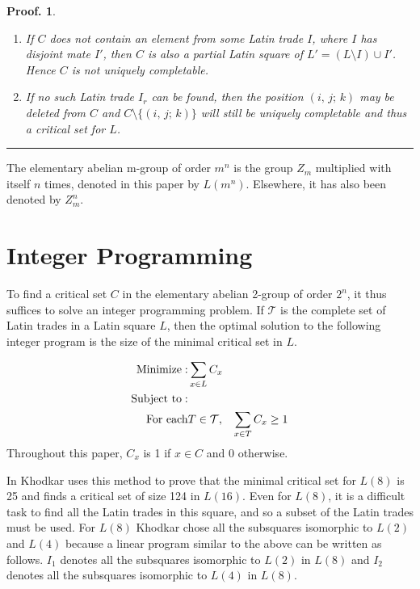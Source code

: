 \documentclass{article}
\newtheorem{preproof}{{\bf Proof.}}
\newenvironment{proof}[1]{\begin{preproof}{\rm
               #1}\hfill{\rule[-0.5mm]{2mm}{2mm}}}{\end{preproof}}
\begin{document}
\begin{proof}{ \noindent
\begin{enumerate}
\item If $C$ does not contain an element from some Latin trade
$I$, where $I$ has  disjoint mate $I'$, then $C$ is also a partial
Latin square of $L'= (L\setminus I)\cup I'$. Hence $C$ is not uniquely
completable.
\item If no such Latin trade $I_r$ can be found, then the position
$(i,\, j;\, k)$ may be deleted from $C$ and $C\setminus\{(i,\,j;\,k)\}$
will still be uniquely
completable and thus a critical set for $L$.
\end{enumerate}
}\end{proof}


The elementary abelian m-group of order $m^n$ is the group $Z_m$
multiplied with itself $n$ times, denoted in this paper by
$L(m^{n})$.  Elsewhere, it has also been denoted by $Z_m^n$.

\section{Integer Programming}
To find a critical set $C$ in the elementary abelian 2-group of
order $2^{n}$, it thus suffices to solve an integer programming
problem.  If $\mathcal{T}$ is the complete set of Latin trades in
a Latin square $L$, then the optimal solution to the following
integer program is the size of the minimal critical set in $L$.

\begin{eqnarray*}
{\rm Minimize}: & \sum_{x \in L}{C_{x}} & \\
{\rm Subject~to}: \\
{\rm For~each} &T \in \mathcal{T},& \sum_{x \in T}{C_{x}} \geq 1 \\
\end{eqnarray*}
Throughout this paper, $C_{x}$ is 1 if $x \in C$ and 0 otherwise.

In \cite{MR99f:05019} Khodkar uses this method to prove that the
minimal critical set for $L(8)$ is 25 and finds a critical set of
size 124 in $L(16)$.  Even for $L(8)$, it is a difficult task to
find all the Latin trades in this square, and so a subset of the
Latin trades must be used.  For $L(8)$ Khodkar chose all the
subsquares isomorphic to $L(2)$ and $L(4)$ because a linear
program similar to the above can be written as follows. $I_1$
denotes all the subsquares isomorphic to $L(2)$ in $L(8)$ and
$I_2$ denotes all the subsquares isomorphic to $L(4)$ in $L(8)$.
\end{document}
